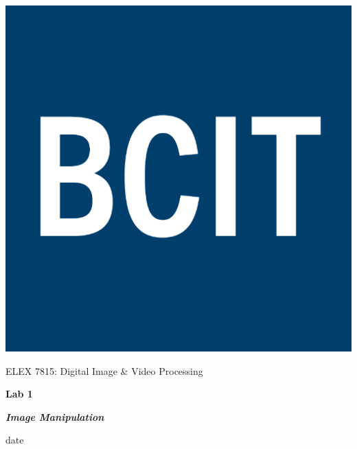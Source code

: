 \documentclass[12pt]{article}
\begin{document}
 

\thispagestyle{titlePage}

\includegraphics[scale=0.12]{BCIT}
\bigskip

\begin{center}
    
    {\fontsize{24pt}{6pt}\selectfont ELEX 7815: Digital Image \& Video Processing}
    
    \vspace{12pt}
    
    {\fontsize{28pt}{12pt}\selectfont\bfseries Lab 1}
    
    \vspace{12pt}
    
    {\fontsize{26pt}{12pt}\selectfont\bfseries\itshape Image Manipulation}
    
    \vspace{12pt}
    
    {\fontsize{16pt}{12pt}\selectfont date}
    
    \vspace{24pt}

\end{center}



\pagebreak

\pagestyle{neilReport}

\tableofcontents

\pagebreak



 

 



 
\end{document}
